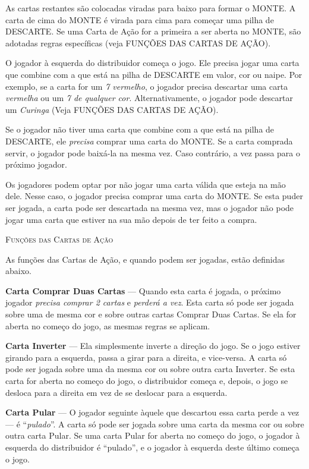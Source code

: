 As cartas restantes são colocadas viradas para baixo para formar o MONTE. A carta de cima do MONTE é virada para cima para começar uma pilha de DESCARTE. Se uma Carta de Ação for a primeira a ser aberta no MONTE, são adotadas regras específicas (veja FUNÇÕES DAS CARTAS DE AÇÃO).

O jogador à esquerda do distribuidor começa o jogo. Ele precisa jogar uma carta que combine com a que está na pilha de DESCARTE em valor, cor ou naipe. Por exemplo, se a carta for um \textit{7 vermelho}, o jogador precisa descartar uma carta \textit{vermelha} ou um \textit{7 de qualquer cor}. Alternativamente, o jogador pode descartar um \textit{Curinga} (Veja FUNÇÕES DAS CARTAS DE AÇÃO).

Se o jogador não tiver uma carta que combine com a que está na pilha de DESCARTE, ele \textit{precisa} comprar uma carta do MONTE. Se a carta comprada servir, o jogador pode baixá-la na mesma vez. Caso contrário, a vez passa para o próximo jogador.

Os jogadores podem optar por não jogar uma carta válida que esteja na mão dele. Nesse caso, o jogador precisa comprar uma carta do MONTE. Se esta puder ser jogada, a carta pode ser descartada na mesma vez, mas o jogador não pode jogar uma carta que estiver na sua mão depois de ter feito a compra.

\vspace{1.25cm}

\textsc{\large{Funções das Cartas de Ação}}

As funções das Cartas de Ação, e quando podem ser jogadas, estão definidas abaixo.

\textbf{Carta Comprar Duas Cartas} --- Quando esta carta é jogada, o próximo jogador \textit{precisa comprar 2 cartas} e \textit{perderá a vez}. Esta carta só pode ser jogada sobre uma de mesma cor e sobre outras cartas Comprar Duas Cartas. Se ela for aberta no começo do jogo, as mesmas regras se aplicam.

\textbf{Carta Inverter} --- Ela simplesmente inverte a direção do jogo. Se o jogo estiver girando para a esquerda, passa a girar para a direita, e vice-versa. A carta só pode ser jogada sobre uma da mesma cor ou sobre outra carta Inverter. Se esta carta for aberta no começo do jogo, o distribuidor começa e, depois, o jogo se desloca para a direita em vez de se deslocar para a esquerda.

\textbf{Carta Pular} --- O jogador seguinte àquele que descartou essa carta perde a vez --- é ``\textit{pulado}''. A carta só pode ser jogada sobre uma carta da mesma cor ou sobre outra carta Pular. Se uma carta Pular for aberta no começo do jogo, o jogador à esquerda do distribuidor é ``pulado'', e o jogador à esquerda deste último começa o jogo.

